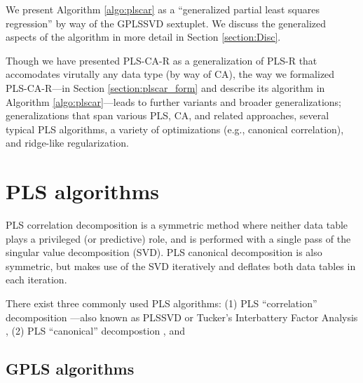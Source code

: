 \documentclass[12pt]{article}
\begin{document}
We present Algorithm \ref{algo:plscar} as a ``generalized partial least
squares regression'' by way of the GPLSSVD sextuplet. We discuss the
generalized aspects of the algorithm in more detail in Section
\ref{section:Disc}.

Though we have presented PLS-CA-R as a generalization of PLS-R that
accomodates virutally any data type (by way of CA), the way we
formalized PLS-CA-R---in Section \ref{section:plscar_form} and describe
its algorithm in Algorithm \ref{algo:plscar}---leads to further variants
and broader generalizations; generalizations that span various PLS, CA,
and related approaches, several typical PLS algorithms, a variety of
optimizations (e.g., canonical correlation), and ridge-like
regularization.

\hypertarget{pls-algorithms}{%
\section{PLS algorithms}\label{pls-algorithms}}

PLS correlation decomposition is a symmetric method where neither data
table plays a privileged (or predictive) role, and is performed with a
single pass of the singular value decomposition (SVD). PLS canonical
decomposition is also symmetric, but makes use of the SVD iteratively
and deflates both data tables in each iteration.

There exist three commonly used PLS algorithms: (1) PLS ``correlation''
decomposition
\citep{krishnan_partial_2011, bookstein1994partial, mcintosh_spatial_1996}---also
known as PLSSVD \citep{tenenhaus_regression_1998} or Tucker's
Interbattery Factor Analysis \citep{tucker_inter-battery_1958}, (2) PLS
``canonical'' decompostion \citep{tenenhaus_regression_1998}, and

\hypertarget{gpls-algorithms}{%
\subsection{GPLS algorithms}\label{gpls-algorithms}}
\end{document}
